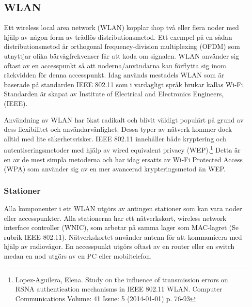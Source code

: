 \documentclass[a4paper,12pt,fleqn]{article}
\begin{document}
\subsection{WLAN}
Ett wireless local area network (WLAN) kopplar ihop två eller flera noder med hjälp av någon form av trådlös distributionsmetod. Ett exempel på en sådan distributionsmetod är orthogonal frequency-division multiplexing (OFDM) som utnyttjar olika bärvågfrekvenser får att koda om signalen. WLAN använder sig oftast av en accesspunkt så att noderna/användarna kan förflytta sig inom räckvidden för denna accesspunkt. Idag används mestadels WLAN som är baserade på standarden IEEE 802.11 som i vardagligt språk brukar kallas Wi-Fi. Standarden är skapat av Institute of Electrical and Electronics Engineers, (IEEE).

Användning av WLAN har ökat radikalt och blivit väldigt populärt på grund av dess flexibilitet och användarvänlighet. Dessa typer av nätverk kommer dock alltid med lite säkerhetsrisker. IEEE 802.11 innehåller både kryptering och autentiseringsmetoder med hjälp av wired equivalent privacy (WEP).\footnote{Lopez-Aguilera, Elena. Study on the influence of transmission errors on RSNA authentication mechanisms in IEEE 802.11 WLAN. Computer Communications Volume: 41 Issue: 5 (2014-01-01) p. 76-93} Detta är en av de mest simpla metoderna och har idag ersatts av  Wi-Fi Protected Access (WPA) som använder sig av en mer avancerad krypteringsmetod än WEP.

\subsubsection{Stationer}
Alla komponenter i ett WLAN utgörs av antingen stationer som kan vara noder eller accesspunkter. Alla stationerna har ett nätverkskort, wireless network interface controller (WNIC), som arbetar på samma lager som MAC-lagret (Se rubrik IEEE 802.11). Nätverkskortet använder antenn för att kommunicera med hjälp av radiovågor. En accesspunkt utgörs oftast av en router eller en switch medan en nod utgörs av en PC eller mobiltelefon.
\end{document}
